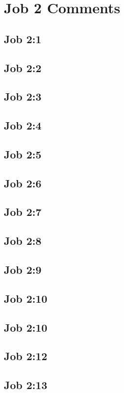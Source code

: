 \section{Job 2  Comments}

\subsection{Job 2:1}

\subsection{Job 2:2}

\subsection{Job 2:3}

\subsection{Job 2:4}

\subsection{Job 2:5}

\subsection{Job 2:6}

\subsection{Job 2:7}

\subsection{Job 2:8}

\subsection{Job 2:9}

\subsection{Job 2:10}

\subsection{Job 2:10}

\subsection{Job 2:12}

\subsection{Job 2:13}
